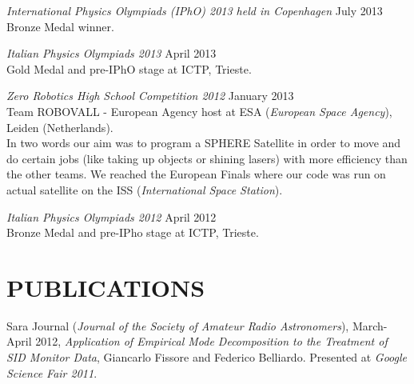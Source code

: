 \documentclass[margin, 10pt]{res} %
\begin{document}
\begin{resume}
{\sl International Physics Olympiads (IPhO) 2013 held in Copenhagen} \hfill July 2013\\
Bronze Medal winner.

{\sl Italian Physics Olympiads 2013} \hfill  April 2013\\
Gold Medal and pre-IPhO stage at ICTP, Trieste.

{\sl Zero Robotics High School Competition 2012} \hfill January 2013\\
Team ROBOVALL - European Agency host at ESA (\textit{European Space Agency}), Leiden (Netherlands).\\
In two words our aim was to program a SPHERE Satellite in order to move and do certain jobs (like taking up objects or shining lasers) with more efficiency than the other teams. We reached the European Finals where our code was run on actual satellite on the ISS (\textit{International Space Station}).

{\sl Italian Physics Olympiads 2012} \hfill April 2012\\
Bronze Medal and pre-IPho stage at ICTP, Trieste.



\section{PUBLICATIONS} 

Sara Journal (\textit{Journal of the Society of Amateur Radio Astronomers}), March-April 2012, \textit{Application of Empirical Mode Decomposition to the Treatment 
of SID Monitor Data}, Giancarlo Fissore and Federico Belliardo. Presented at \textit{Google Science Fair 2011}.\\




\end{resume}
\end{document}
